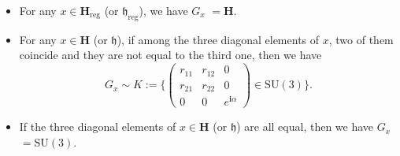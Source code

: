 \documentclass[12pt]{amsart}
\theoremstyle{definition}
\numberwithin{equation}{section}
\newcommand{\imagunit}{\mathbf{i}}
\newcommand{\SU}{\mathrm{SU}}
\newcommand{\SUthree}{\SU(3)}
\newcommand{\Hreg}{\Cartan_{\mathrm{reg}}}
\newcommand{\hreg}{\mathfrak{h}_{\mathrm{reg}}}
\newcommand{\Cartan}{\mathbf{H}}
\newcommand{\cartan}{\mathfrak{h}}
\begin{document}
\begin{itemize}
  \item[(1)]  For any $x\in \Hreg$ (or $\hreg$), we have   $G_x$   $=\Cartan$.
  \item[(2)]  For any $x\in \Cartan$ (or $\cartan$), if  among the three diagonal elements of $x$,  two of them coincide and they are not equal to the third one, then we have
\begin{equation}\label{Eqt:Kgroup}
	G_x\sim	K:=\Big\{
	\begin{pmatrix}
		{r_{11}}     		&   r_{12}				 & 0  \\
		{r_{21}}	    &  {r_{22}}    & 0  \\
		0					 					    & 0 										 & e^{\imagunit  \alpha}
	\end{pmatrix}\in \SU(3)  \Big\}.
\end{equation}

  \item[(3)]  If the three diagonal elements of $x\in \Cartan$ (or $\cartan$) are all equal, then we have  $G_x$    $=\SUthree$.
\end{itemize}
	
\end{document}
